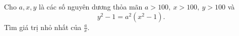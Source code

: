 \ifshowproblem
\begin{problem}\label{example:RUS-2015-MO-9-P3}
    Cho \( a, x, y \) là các số nguyên dương thỏa mãn \( a > 100,\ x > 100,\ y > 100 \) và
    \[
        y^2 - 1 = a^2(x^2 - 1).
    \]
    Tìm giá trị nhỏ nhất của \( \frac{a}{x} \).    
\end{problem}
\fi

\footnotemark
{}
\fi
